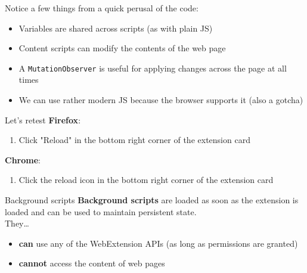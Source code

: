 \documentclass[../index.tex]{subfiles}
\begin{document}
\begin{frame}[fragile]{\currenttitle}
  Notice a few things from a quick perusal of the code:

  \begin{itemize}
    \item Variables are shared across scripts (as with plain JS)
    \item Content scripts can modify the contents of the web page
    \item A \texttt{MutationObserver}\footnotemark{} is useful for applying changes across the
          page at all times
    \item We can use rather modern JS because the browser supports it (also a
          gotcha)
  \end{itemize}

\end{frame}

\renewcommand{\currenttitle}{Let's retest}
\begin{frame}[fragile]{\currenttitle}
  \textbf{Firefox}:
  \begin{enumerate}
    \item Click "Reload" in the bottom right corner of the extension card
  \end{enumerate}

  \textbf{Chrome}:
  \begin{enumerate}
    \item Click the reload icon in the bottom right corner of the extension
          card
  \end{enumerate}
\end{frame}

\renewcommand{\currenttitle}{Background scripts}
\begin{frame}[fragile]{\currenttitle}
  \textbf{Background scripts}\footnotemark{} are loaded as soon as the extension is loaded and can be
  used to maintain persistent state. \\[1em]

  They\dots
  \begin{itemize}
    \item \textbf{can} use any of the WebExtension APIs (as long as permissions
          are granted)
    \item \textbf{cannot} access the content of web pages
  \end{itemize}

\end{frame}
\end{document}
